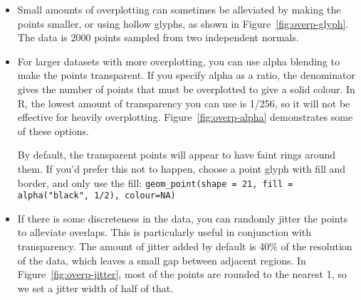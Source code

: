 \begin{itemize}
  \item Small amounts of overplotting can sometimes be alleviated by making the points smaller, or using hollow glyphs, as shown in Figure~\ref{fig:overp-glyph}.  The data is 2000 points sampled from two independent normals.

    
  
  \item For larger datasets with more overplotting, you can use alpha blending to make the points transparent.  If you specify alpha as a ratio, the denominator gives the number of points that must be overplotted to give a solid colour.  In R, the lowest amount of transparency you can use is 1/256, so it will not be effective for heavily overplotting.  Figure~\ref{fig:overp-alpha} demonstrates some of these options.
  
  By default, the transparent points will appear to have faint rings around them.  If you'd prefer this not to happen, choose a point glyph with fill and border, and only use the fill: {\tt geom\_point(shape = 21, fill = alpha("black", 1/2), colour=NA)}
  
    

  \item If there is some discreteness in the data, you can randomly jitter the points to alleviate overlaps.  This is particularly useful in conjunction with transparency.  The amount of jitter added by default is 40\% of the resolution of the data, which leaves a small gap between adjacent regions. In Figure~\ref{fig:overp-jitter}, most of the points are rounded to the nearest 1, so we set a jitter width of half of that.
  

\end{itemize}
